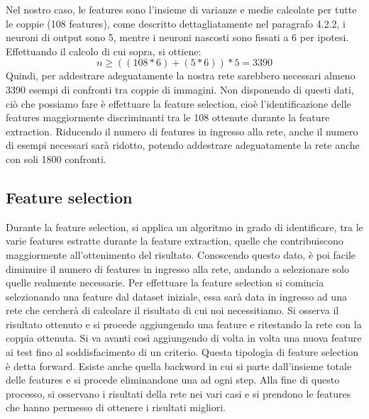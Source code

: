 \documentclass[a4paper,11pt]{article}
\begin{document}
    Nel nostro caso, le features sono l'insieme di varianze e medie calcolate per tutte le coppie (108 features), come descritto dettagliatamente nel paragrafo 4.2.2, i neuroni di output sono 5, mentre i neuroni nascosti sono fissati a 6 per ipotesi.
    Effettuando il calcolo di cui sopra, si ottiene: 
    $$ n \geq ((108*6)+(5*6))*5 = 3390 $$
    Quindi, per addestrare adeguatamente la nostra rete sarebbero necessari almeno 3390 esempi  di confronti tra coppie di immagini.
    Non disponendo di questi dati, ciò che possiamo fare è effettuare la feature selection, cioè l'identificazione delle features maggiormente discriminanti tra le 108 ottenute durante la feature extraction.
    Riducendo il numero di features in ingresso alla rete, anche il numero di esempi necessari sarà ridotto, potendo addestrare adeguatamente la rete anche con soli 1800 confronti.
    \subsection{Feature selection}
    Durante la feature selection, si applica un algoritmo in grado di identificare, tra le varie features estratte durante la feature extraction, quelle che contribuiscono maggiormente all'ottenimento del risultato.
    Conoscendo questo dato, è poi facile diminuire il numero di features in ingresso alla rete, andando a selezionare solo quelle realmente necessarie. 
    Per effettuare la feature selection si comincia selezionando una feature dal dataset iniziale, essa sarà data in ingresso ad una rete che cercherà di calcolare il risultato di cui noi necessitiamo.
    Si osserva il risultato ottenuto e si procede aggiungendo una feature e ritestando la rete con la coppia ottenuta. Si va avanti così aggiungendo di volta in volta una nuova feature ai test fino al soddisfacimento di un criterio.
    Questa tipologia di feature selection è detta forward. Esiste anche quella backword in cui si parte dall'insieme totale delle features e si procede eliminandone una ad ogni step.
    Alla fine di questo processo, si osservano i risultati della rete nei vari casi e si prendono le features che hanno permesso di ottenere i risultati migliori.
    \newpage
\end{document}
